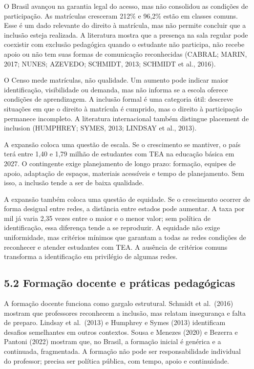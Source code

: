 O Brasil avançou na garantia legal do acesso, mas não consolidou as
condições de participação. As matrículas cresceram 212\% e 96,2\% estão
em classes comuns. Esse é um dado relevante do direito à matrícula, mas
não permite concluir que a inclusão esteja realizada. A literatura
mostra que a presença na sala regular pode coexistir com exclusão
pedagógica quando o estudante não participa, não recebe apoio ou não tem
suas formas de comunicação reconhecidas (CABRAL; MARIN, 2017; NUNES;
AZEVEDO; SCHMIDT, 2013; SCHMIDT et al., 2016).

O Censo mede matrículas, não qualidade. Um aumento pode indicar maior
identificação, visibilidade ou demanda, mas não informa se a escola
oferece condições de aprendizagem. A inclusão formal é uma categoria
útil: descreve situações em que o direito à matrícula é cumprido, mas o
direito à participação permanece incompleto. A literatura internacional
também distingue placement de inclusion (HUMPHREY; SYMES, 2013; LINDSAY
et al., 2013).

A expansão coloca uma questão de escala. Se o crescimento se mantiver, o
país terá entre 1,40 e 1,79 milhão de estudantes com TEA na educação
básica em 2027. O contingente exige planejamento de longo prazo:
formação, equipes de apoio, adaptação de espaços, materiais acessíveis e
tempo de planejamento. Sem isso, a inclusão tende a ser de baixa
qualidade.

A expansão também coloca uma questão de equidade. Se o crescimento
ocorrer de forma desigual entre redes, a distância entre estados pode
aumentar. A taxa por mil já varia 2,35 vezes entre o maior e o menor
valor; sem política de identificação, essa diferença tende a se
reproduzir. A equidade não exige uniformidade, mas critérios mínimos que
garantam a todas as redes condições de reconhecer e atender estudantes
com TEA. A ausência de critérios comuns transforma a identificação em
privilégio de algumas redes.

\subsection{5.2 Formação docente e práticas
pedagógicas}\label{formauxe7uxe3o-docente-e-pruxe1ticas-pedaguxf3gicas}

A formação docente funciona como gargalo estrutural. Schmidt et
al.~(2016) mostram que professores reconhecem a inclusão, mas relatam
insegurança e falta de preparo. Lindsay et al.~(2013) e Humphrey e Symes
(2013) identificam desafios semelhantes em outros contextos. Sousa e
Menezes (2020) e Bezerra e Pantoni (2022) mostram que, no Brasil, a
formação inicial é genérica e a continuada, fragmentada. A formação não
pode ser responsabilidade individual do professor; precisa ser política
pública, com tempo, apoio e continuidade.

